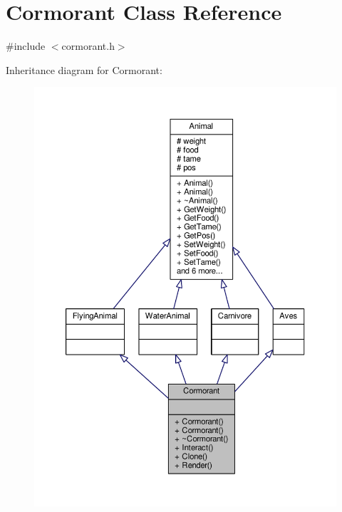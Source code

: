 \hypertarget{classCormorant}{}\section{Cormorant Class Reference}
\label{classCormorant}


{\ttfamily \#include $<$cormorant.\+h$>$}



Inheritance diagram for Cormorant\+:
\nopagebreak
\begin{figure}[H]
\begin{center}
\leavevmode
\includegraphics[width=350pt]{classCormorant__inherit__graph}
\end{center}
\end{figure}


